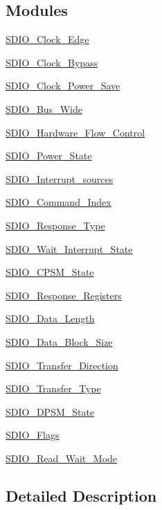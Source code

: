 \subsection*{Modules}
\begin{DoxyCompactItemize}
\item 
\hyperlink{group___s_d_i_o___clock___edge}{S\+D\+I\+O\+\_\+\+Clock\+\_\+\+Edge}
\item 
\hyperlink{group___s_d_i_o___clock___bypass}{S\+D\+I\+O\+\_\+\+Clock\+\_\+\+Bypass}
\item 
\hyperlink{group___s_d_i_o___clock___power___save}{S\+D\+I\+O\+\_\+\+Clock\+\_\+\+Power\+\_\+\+Save}
\item 
\hyperlink{group___s_d_i_o___bus___wide}{S\+D\+I\+O\+\_\+\+Bus\+\_\+\+Wide}
\item 
\hyperlink{group___s_d_i_o___hardware___flow___control}{S\+D\+I\+O\+\_\+\+Hardware\+\_\+\+Flow\+\_\+\+Control}
\item 
\hyperlink{group___s_d_i_o___power___state}{S\+D\+I\+O\+\_\+\+Power\+\_\+\+State}
\item 
\hyperlink{group___s_d_i_o___interrupt__sources}{S\+D\+I\+O\+\_\+\+Interrupt\+\_\+sources}
\item 
\hyperlink{group___s_d_i_o___command___index}{S\+D\+I\+O\+\_\+\+Command\+\_\+\+Index}
\item 
\hyperlink{group___s_d_i_o___response___type}{S\+D\+I\+O\+\_\+\+Response\+\_\+\+Type}
\item 
\hyperlink{group___s_d_i_o___wait___interrupt___state}{S\+D\+I\+O\+\_\+\+Wait\+\_\+\+Interrupt\+\_\+\+State}
\item 
\hyperlink{group___s_d_i_o___c_p_s_m___state}{S\+D\+I\+O\+\_\+\+C\+P\+S\+M\+\_\+\+State}
\item 
\hyperlink{group___s_d_i_o___response___registers}{S\+D\+I\+O\+\_\+\+Response\+\_\+\+Registers}
\item 
\hyperlink{group___s_d_i_o___data___length}{S\+D\+I\+O\+\_\+\+Data\+\_\+\+Length}
\item 
\hyperlink{group___s_d_i_o___data___block___size}{S\+D\+I\+O\+\_\+\+Data\+\_\+\+Block\+\_\+\+Size}
\item 
\hyperlink{group___s_d_i_o___transfer___direction}{S\+D\+I\+O\+\_\+\+Transfer\+\_\+\+Direction}
\item 
\hyperlink{group___s_d_i_o___transfer___type}{S\+D\+I\+O\+\_\+\+Transfer\+\_\+\+Type}
\item 
\hyperlink{group___s_d_i_o___d_p_s_m___state}{S\+D\+I\+O\+\_\+\+D\+P\+S\+M\+\_\+\+State}
\item 
\hyperlink{group___s_d_i_o___flags}{S\+D\+I\+O\+\_\+\+Flags}
\item 
\hyperlink{group___s_d_i_o___read___wait___mode}{S\+D\+I\+O\+\_\+\+Read\+\_\+\+Wait\+\_\+\+Mode}
\end{DoxyCompactItemize}


\subsection{Detailed Description}
